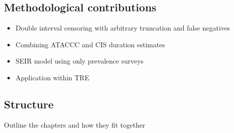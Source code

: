 \documentclass[thesis.tex]{subfiles}
\begin{document}
\subsection{Methodological contributions}

\begin{itemize}
    \item Double interval censoring with arbitrary truncation and false negatives
    \item Combining ATACCC and CIS duration estimates
    \item SEIR model using only prevalence surveys
    \item Application within TRE
\end{itemize}

\subsection{Structure}

Outline the chapters and how they fit together
\end{document}
